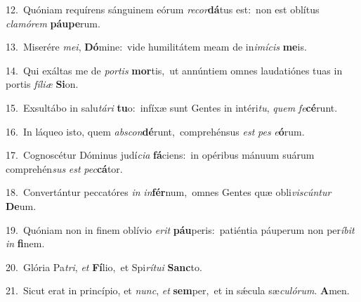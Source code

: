 {\numbfont\textcolor{\numbcolor}{12.}}~Quóniam requírens sánguinem eórum \textit{re}\-\textit{cor}\textbf{dá}tus est:~\star non est oblítus \textit{cla}\-\textit{mó}\textit{rem} \textbf{páu}\-\textbf{pe}rum.\par
{\numbfont\textcolor{\numbcolor}{13.}}~Miserére \textit{me}\-\textit{i}, \textbf{Dó}\-mine:~\star vide humilitátem meam de in\-\textit{i}\-\textit{mí}\textit{cis} \textbf{me}\-is.\par
{\numbfont\textcolor{\numbcolor}{14.}}~Qui exáltas me de \textit{por}\-\textit{tis} \textbf{mor}\-tis,~\star ut annúntiem omnes laudatiónes tuas in portis \textit{fí}\-\textit{li}\textit{æ} \textbf{Si}\-on.\par
{\numbfont\textcolor{\numbcolor}{15.}}~Exsultábo in salu\-\textit{tá}\-\textit{ri} \textbf{tu}\-o:~\star infíxæ sunt Gentes in intéri\-\textit{tu}\-, \textit{quem} \textit{fe}\-\textbf{cé}runt.\par
{\numbfont\textcolor{\numbcolor}{16.}}~In láqueo isto, quem \textit{abs}\-\textit{con}\textbf{dé}runt,~\star comprehénsus \textit{est} \textit{pes} \textit{e}\-\textbf{ó}rum.\par
{\numbfont\textcolor{\numbcolor}{17.}}~Cognoscétur Dóminus judí\-\textit{ci}\-\textit{a} \textbf{fá}\-ciens:~\star in opéribus mánuum suárum comprehén\textit{sus} \textit{est} \textit{pec}\-\textbf{cá}tor.\par
{\numbfont\textcolor{\numbcolor}{18.}}~Convertántur peccatóres \textit{in} \textit{in}\-\textbf{fér}num,~\star omnes Gentes quæ obli\-\textit{vis}\-\textit{cún}\textit{tur} \textbf{De}\-um.\par
{\numbfont\textcolor{\numbcolor}{19.}}~Quóniam non in finem oblívio \textit{e}\-\textit{rit} \textbf{páu}\-peris:~\star patiéntia páuperum non per\-\textit{í}\-\textit{bit} \textit{in} \textbf{fi}\-nem.\par
{\numbfont\textcolor{\numbcolor}{20.}}~Glória Pa\-\textit{tri}\-, \textit{et} \textbf{Fí}\-lio,~\star et Spi\-\textit{rí}\-\textit{tu}\textit{i} \textbf{Sanc}\-to.\par
{\numbfont\textcolor{\numbcolor}{21.}}~Sicut erat in princípio, et \textit{nunc}\-, \textit{et} \textbf{sem}\-per,~\star et in sǽcula sæ\-\textit{cu}\-\textit{ló}\textit{rum}. \textbf{A}\-men.\par
